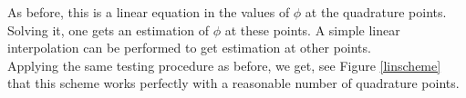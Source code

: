 \documentclass[a4paper,11pt]{article}
\begin{document}
\noindent As before, this is a linear equation in the values of $\phi$ at the quadrature points. Solving it, one gets an estimation of $\phi$ at these points. A simple linear interpolation can be performed to get estimation at other points.\\


\noindent Applying the same testing procedure as before, we get, see Figure \ref{linscheme} that this scheme works perfectly with a reasonable number of quadrature points.

%
%
\end{document}

